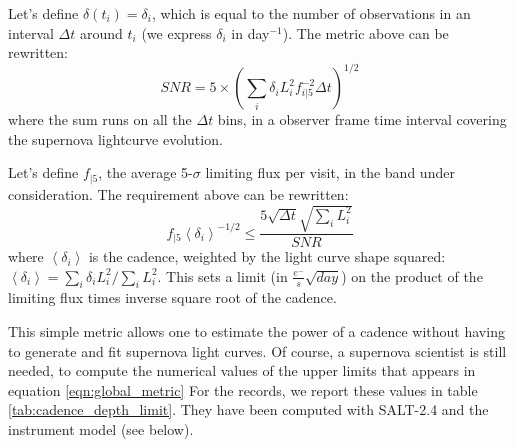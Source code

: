 \documentclass[\docopts]{\docclass}
\begin{document}
Let's define $\delta(t_i) = \delta_i$, which is equal to the number of
observations in an interval $\Delta t$ around $t_i$ (we express
$\delta_i$ in day$^{-1}$). The metric above can be rewritten:
\begin{equation}
  SNR = 5 \times \left(\sum_i \delta_i L^2_i f^{-2}_{i|5} \Delta t\right)^{1/2}
\end{equation}
where the sum runs on all the $\Delta t$ bins, in a observer frame
time interval covering the supernova lightcurve evolution. 

Let's define $f_{|5}$, the average 5-$\sigma$ limiting flux per visit,
in the band under consideration. The requirement above can be
rewritten:
\begin{equation}
  f_{|5} \left<\delta_i\right>^{-1/2} \leq \frac{5 \sqrt{\Delta t} \sqrt{\sum_i L_i^2}}{SNR}
  \label{eqn:global_metric}
\end{equation}
where $\left<\delta_i\right>$ is the cadence, weighted by the light
curve shape squared: $\left<\delta_i\right> = \sum_i \delta_i
L_i^2/\sum_i L_i^2$.  This sets a limit (in $\frac{e^-}{s}
\sqrt{day}$) on the product of the limiting flux times inverse square
root of the cadence.

This simple metric allows one to estimate the power of a cadence
without having to generate and fit supernova light curves.  Of course,
a supernova scientist is still needed, to compute the numerical values
of the upper limits that appears in equation \ref{eqn:global_metric}
For the records, we report these values in table
\ref{tab:cadence_depth_limit}. They have been computed with SALT-2.4
and the  instrument model (see below).
\end{document}
